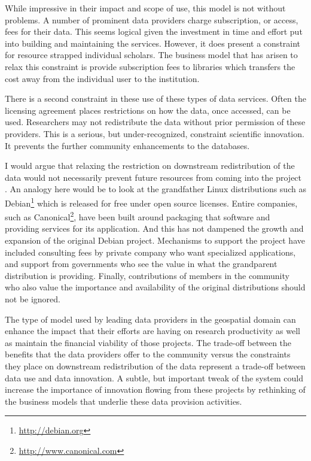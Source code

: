 \documentclass[11pt]{article}
\begin{document}
While impressive in their impact and scope of use, this model is not without
problems. A number of prominent data providers charge subscription, or access,
fees for their data. This seems logical given the investment in time and effort
put into building and maintaining the services. However, it does present a
constraint for resource strapped individual scholars. The business model that
has arisen to relax this constraint is provide subscription fees to libraries
which transfers the cost away from the individual user to the institution.

There is a second constraint in these use of these types of data services.
Often the licensing agreement places restrictions on how the data, once
accessed, can be used. Researchers may not redistribute the data without prior
permission of these providers. This is a serious, but under-recognized,
constraint scientific innovation. It prevents the further community enhancements
to the databases.


I would argue that relaxing the restriction on downstream redistribution of the
data would not necessarily prevent future resources from coming into the project
\cite{rey_open_2014}. An analogy here would be to look at the grandfather Linux
distributions such as Debian\footnote{\url{http://debian.org}} which is
released for free under open source licenses. Entire companies, such as
Canonical\footnote{\url{http://www.canonical.com}}, have been built around
packaging that software and providing services for its application. And this has
not dampened the growth and expansion of the original Debian project. Mechanisms
to support the project have included consulting fees by private company who want
specialized applications, and support from governments who see the value in what
the grandparent distribution is providing. Finally, contributions of members in
the community who also value the importance and availability of the original
distributions should not be ignored.

The type of model used by leading data providers in the geospatial domain can
enhance the impact that their efforts are having on research productivity as
well as maintain the financial viability of those projects. The trade-off
between the benefits that the data providers offer to the community versus
the constraints they place on downstream redistribution of the data represent a
trade-off between data use and data innovation. A subtle, but important tweak of
the system could increase the importance of innovation flowing from these
projects by rethinking of the business models that underlie these data 
provision activities.
\end{document}
